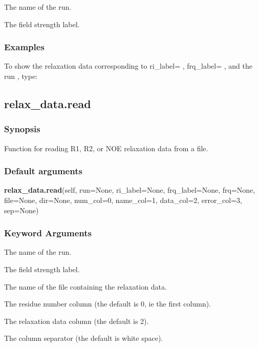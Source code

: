   The name of the run.

  The field strength label.

\subsubsection{Examples}

To show the relaxation data corresponding to ri\_label=
, frq\_label=
, and the run
, type:




\newpage

\subsection{relax\_data.read}


\subsubsection{Synopsis}

Function for reading R1, R2, or NOE relaxation data from a file.

\subsubsection{Default arguments}

\textsf{\textbf{relax\_data.read}(self, run=None, ri\_label=None, frq\_label=None, frq=None, file=None, dir=None, num\_col=0, name\_col=1, data\_col=2, error\_col=3, sep=None)}


\subsubsection{Keyword Arguments}

  The name of the run.

  The field strength label.

  The name of the file containing the relaxation data.

  The residue number column (the default is 0, ie the first column).

  The relaxation data column (the default is 2).

  The column separator (the default is white space).

